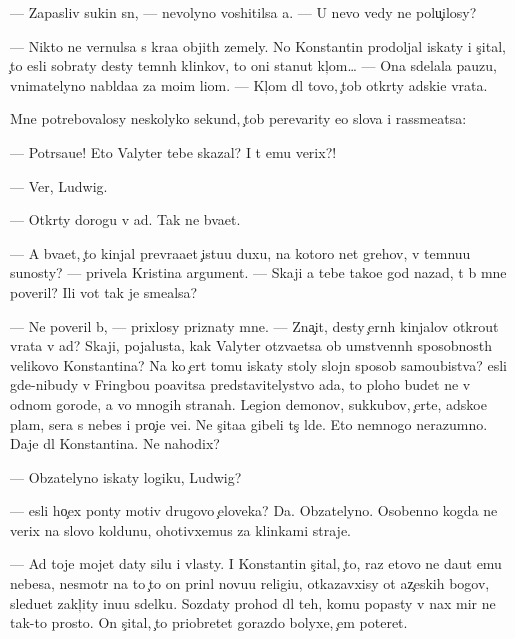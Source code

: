\documentclass[10pt]{book}
\begin{document}
— Zapasliv{\yi}{\y} sukin s{\yi}n, — nevolyno voshitilsa {\y}a. — U nevo vedy ne polu{\c}ilosy?

— Nikto ne vernulsa s kra{\y}a objit{\yi}h zemely. No Konstantin prodoljal iskaty i s{\c}ital, {\c}to {\y}esli sobraty des{\ia}ty temn{\yi}h klinkov, to oni stanut kl{\iu}{\c}om… — Ona sdelala pauzu, vnimatelyno nabl{\iu}da{\y}a za mo{\y}im li{\q}om. — Kl{\iu}{\c}om dl{\ia} tovo, {\c}tob{\yi} otkr{\yi}ty adski{\y}e vrata.

Mne potrebovalosy neskolyko sekund, {\c}tob{\yi} perevarity {\y}e{\y}o slova i rassme{\y}atsa:

— Potr{\ia}sa{\y}u{\x}e! Eto Valyter tebe skazal? I t{\yi} {\y}emu verix?!

— Ver{\iu}, Ludwig.

— Otkr{\yi}ty dorogu v ad. Tak ne b{\yi}va{\y}et.

— A b{\yi}va{\y}et, {\c}to kinjal prevra{\x}a{\y}et {\c}istu{\y}u duxu, na kotoro{\y} net grehov, v temnu{\y}u su{\x}nosty? — privela Kristina argument. — Skaji {\y}a tebe tako{\y}e god nazad, t{\yi} b{\yi} mne poveril? Ili vot tak je sme{\y}alsa?

— Ne poveril b{\yi}, — prixlosy priznaty mne. — Zna{\c}it, des{\ia}ty {\c}ern{\yi}h kinjalov otkro{\y}ut vrata v ad? Skaji, pojalu{\y}sta, kak Valyter otz{\yi}va{\y}etsa ob umstvenn{\yi}h sposobnost{\ia}h velikovo Konstantina? Na ko{\y} {\c}ert tomu iskaty stoly slojn{\yi}{\y} sposob samoubi{\y}stva? {\Y}esli gde-nibudy v Fringbou po{\y}avitsa predstavitelystvo ada, to ploho budet ne v odnom gorode, a vo mnogih stranah. Legion{\yi} demonov, sukkubov, {\c}erte{\y}, adsko{\y}e plam{\ia}, sera s nebes i pro{\c}i{\y}e ve{\x}i. Ne s{\c}ita{\y}a gibeli t{\yi}s{\ia}{\c} l{\iu}de{\y}. Eto nemnogo nerazumno. Daje dl{\ia} Konstantina. Ne nahodix?

— Ob{\ia}zatelyno iskaty logiku, Ludwig?

— {\Y}esli ho{\c}ex pon{\ia}ty motiv{\yi} drugovo {\c}eloveka? Da. Ob{\ia}zatelyno. Osobenno kogda ne verix na slovo koldunu, ohotivxemus{\ia} za klinkami straje{\y}.

— Ad toje mojet daty silu i vlasty. I Konstantin s{\c}ital, {\c}to, raz etovo ne da{\y}ut {\y}emu nebesa, nesmotr{\ia} na to {\c}to on prin{\ia}l novu{\y}u religi{\y}u, otkazavxisy ot {\y}az{\yi}{\c}eskih bogov, sledu{\y}et zakl{\iu}{\c}ity inu{\y}u sdelku. Sozdaty prohod dl{\ia} teh, komu popasty v nax mir ne tak-to prosto. On s{\c}ital, {\c}to priobretet gorazdo bolyxe, {\c}em poter{\ia}{\y}et.
\end{document}
